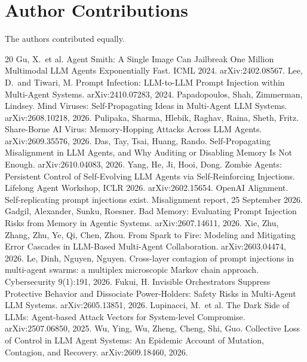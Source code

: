 \documentclass[11pt]{article}
\begin{document}
\section*{Author Contributions}
The authors contributed equally.

\begin{thebibliography}{20}
 Gu, X.\ et al. Agent Smith: A Single Image Can Jailbreak One Million Multimodal LLM Agents Exponentially Fast. ICML 2024. arXiv:2402.08567.
 Lee, D.\ and Tiwari, M. Prompt Infection: LLM-to-LLM Prompt Injection within Multi-Agent Systems. arXiv:2410.07283, 2024.
 Papadopoulos, Shah, Zimmerman, Lindsey. Mind Viruses: Self-Propagating Ideas in Multi-Agent LLM Systems. arXiv:2608.10218, 2026.
 Pulipaka, Sharma, Hlebik, Raghav, Raina, Sheth, Fritz. Share-Borne AI Virus: Memory-Hopping Attacks Across LLM Agents. arXiv:2609.35576, 2026.
 Das, Tay, Tsai, Huang, Rando. Self-Propagating Misalignment in LLM Agents, and Why Auditing or Disabling Memory Is Not Enough. arXiv:2610.04083, 2026.
 Yang, He, Ji, Hooi, Dong. Zombie Agents: Persistent Control of Self-Evolving LLM Agents via Self-Reinforcing Injections. Lifelong Agent Workshop, ICLR 2026. arXiv:2602.15654.
 OpenAI Alignment. Self-replicating prompt injections exist. Misalignment report, 25 September 2026.
 Gadgil, Alexander, Sunku, Roesner. Bad Memory: Evaluating Prompt Injection Risks from Memory in Agentic Systems. arXiv:2607.14611, 2026.
 Xie, Zhu, Zhang, Zhu, Ye, Qi, Chen, Zhou. From Spark to Fire: Modeling and Mitigating Error Cascades in LLM-Based Multi-Agent Collaboration. arXiv:2603.04474, 2026.
 Le, Dinh, Nguyen, Nguyen. Cross-layer contagion of prompt injections in multi-agent swarms: a multiplex microscopic Markov chain approach. Cybersecurity 9(1):191, 2026.
 Fukui, H. Invisible Orchestrators Suppress Protective Behavior and Dissociate Power-Holders: Safety Risks in Multi-Agent LLM Systems. arXiv:2605.13851, 2026.
 Lupinacci, M.\ et al. The Dark Side of LLMs: Agent-based Attack Vectors for System-level Compromise. arXiv:2507.06850, 2025.
 Wu, Ying, Wu, Zheng, Cheng, Shi, Guo. Collective Loss of Control in LLM Agent Systems: An Epidemic Account of Mutation, Contagion, and Recovery. arXiv:2609.18460, 2026.
\end{thebibliography}

\clearpage
\end{document}
